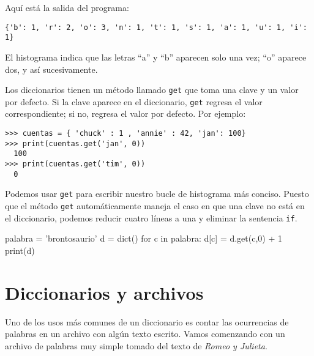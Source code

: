 
Aquí está la salida del programa:

\begin{verbatim}
{'b': 1, 'r': 2, 'o': 3, 'n': 1, 't': 1, 's': 1, 'a': 1, 'u': 1, 'i': 1}
\end{verbatim}

El histograma indica que las letras ``a'' y ``b'' aparecen solo una vez;
``o'' aparece dos, y así sucesivamente.

 

Los diccionarios tienen un método llamado \texttt{get} que toma una
clave y un valor por defecto. Si la clave aparece en el diccionario,
\texttt{get} regresa el valor correspondiente; si no, regresa el valor
por defecto. Por ejemplo:


\begin{Verbatim}[frame=single]
>>> cuentas = { 'chuck' : 1 , 'annie' : 42, 'jan': 100}
>>> print(cuentas.get('jan', 0))
  100
>>> print(cuentas.get('tim', 0))
  0
\end{Verbatim}


Podemos usar \texttt{get} para escribir nuestro bucle de histograma más
conciso. Puesto que el método \texttt{get} automáticamente maneja el
caso en que una clave no está en el diccionario, podemos reducir cuatro
líneas a una y eliminar la sentencia \texttt{if}.


\begin{python}[frame=single]
palabra = 'brontosaurio'
d = dict()
for c in palabra:
    d[c] = d.get(c,0) + 1
print(d)
\end{python}



\hypertarget{diccionarios-y-archivos}{%
\section{Diccionarios y archivos}\label{diccionarios-y-archivos}}

Uno de los usos más comunes de un diccionario es contar las ocurrencias
de palabras en un archivo con algún texto escrito. Vamos comenzando con
un archivo de palabras muy simple tomado del texto de \emph{Romeo y
Julieta}.

